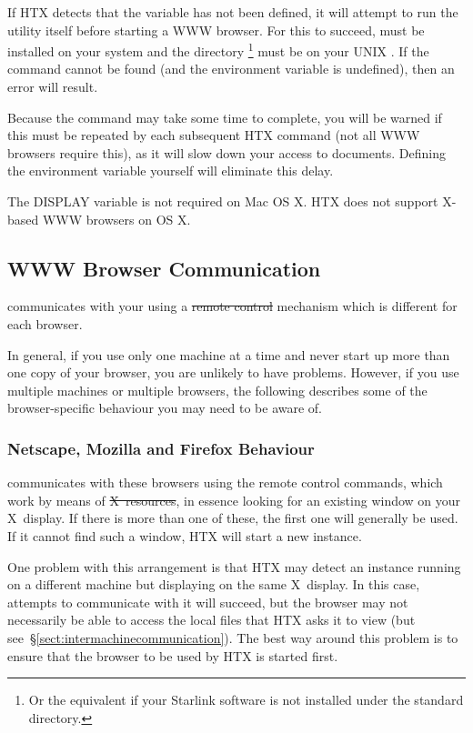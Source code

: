 If HTX detects that the  variable has not been defined, it
will attempt to run the  utility itself before starting a
WWW browser. For this to succeed,  must be installed on
your system and the directory \footnote{Or the
equivalent if your Starlink software is not installed under the
standard  directory.} must be on your UNIX . If the
 command cannot be found (and the 
environment variable is undefined), then an error will result.

Because the  command may take some time to complete, you
will be warned if this must be repeated by each subsequent HTX
command (not all WWW browsers require this), as it will slow down your
access to documents. Defining the  environment variable
yourself will eliminate this delay.

The DISPLAY variable is not required on Mac OS X. HTX does not support
X-based WWW browsers on OS X.

\subsection{\label{sect:browsercommunication}WWW Browser Communication}

 communicates with your  using a \st{remote control} mechanism
which is different for each browser. 

In general, if you use only one machine at a time and never start up
more than one copy of your browser, you are unlikely to have
problems. However, if you use multiple machines or multiple browsers,
the following describes some of the browser-specific behaviour you may
need to be aware of.

\subsubsection{Netscape, Mozilla and Firefox Behaviour}

 communicates with these browsers using
the remote control commands, which work by means of \st{X~resources}, in
essence looking for an existing window on your X~display. If there is more
than one of these, the first one will generally be used. If it cannot find
such a window, HTX will start a new instance.

One problem with this arrangement is that HTX may detect an instance running
on a different machine but displaying on the same X~display. In this case,
attempts to communicate with it will succeed, but the browser may not
necessarily be able to access the local files that HTX asks it to view (but
see~\S\ref{sect:intermachinecommunication}). The best way around this problem
is to ensure that the browser to be used by HTX is started first.

